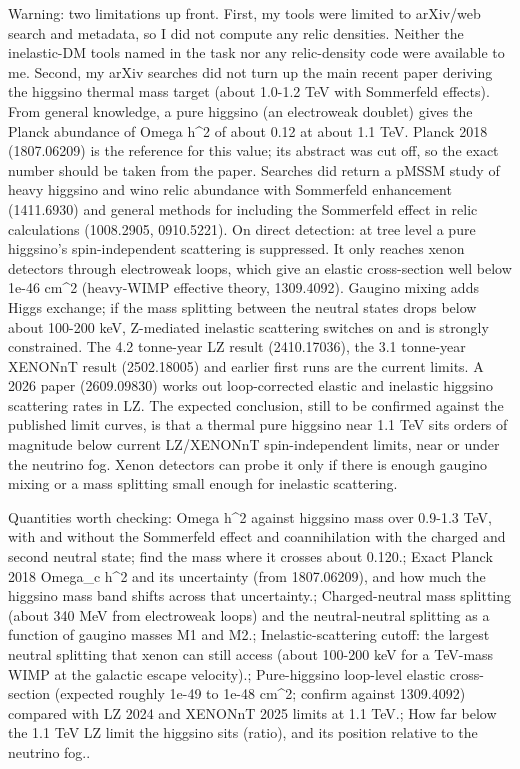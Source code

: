 \documentclass[11pt,a4paper]{article}
\begin{document}
Warning: two limitations up front. First, my tools were limited to arXiv/web search and metadata, so I did not compute any relic densities. Neither the inelastic-DM tools named in the task nor any relic-density code were available to me. Second, my arXiv searches did not turn up the main recent paper deriving the higgsino thermal mass target (about 1.0-1.2 TeV with Sommerfeld effects). From general knowledge, a pure higgsino (an electroweak doublet) gives the Planck abundance of Omega h\textasciicircum{}2 of about 0.12 at about 1.1 TeV. Planck 2018 (1807.06209) is the reference for this value; its abstract was cut off, so the exact number should be taken from the paper. Searches did return a pMSSM study of heavy higgsino and wino relic abundance with Sommerfeld enhancement (1411.6930) and general methods for including the Sommerfeld effect in relic calculations (1008.2905, 0910.5221). On direct detection: at tree level a pure higgsino's spin-independent scattering is suppressed. It only reaches xenon detectors through electroweak loops, which give an elastic cross-section well below 1e-46 cm\textasciicircum{}2 (heavy-WIMP effective theory, 1309.4092). Gaugino mixing adds Higgs exchange; if the mass splitting between the neutral states drops below about 100-200 keV, Z-mediated inelastic scattering switches on and is strongly constrained. The 4.2 tonne-year LZ result (2410.17036), the 3.1 tonne-year XENONnT result (2502.18005) and earlier first runs are the current limits. A 2026 paper (2609.09830) works out loop-corrected elastic and inelastic higgsino scattering rates in LZ. The expected conclusion, still to be confirmed against the published limit curves, is that a thermal pure higgsino near 1.1 TeV sits orders of magnitude below current LZ/XENONnT spin-independent limits, near or under the neutrino fog. Xenon detectors can probe it only if there is enough gaugino mixing or a mass splitting small enough for inelastic scattering.

Quantities worth checking: Omega h\textasciicircum{}2 against higgsino mass over 0.9-1.3 TeV, with and without the Sommerfeld effect and coannihilation with the charged and second neutral state; find the mass where it crosses about 0.120.; Exact Planck 2018 Omega\_c h\textasciicircum{}2 and its uncertainty (from 1807.06209), and how much the higgsino mass band shifts across that uncertainty.; Charged-neutral mass splitting (about 340 MeV from electroweak loops) and the neutral-neutral splitting as a function of gaugino masses M1 and M2.; Inelastic-scattering cutoff: the largest neutral splitting that xenon can still access (about 100-200 keV for a TeV-mass WIMP at the galactic escape velocity).; Pure-higgsino loop-level elastic cross-section (expected roughly 1e-49 to 1e-48 cm\textasciicircum{}2; confirm against 1309.4092) compared with LZ 2024 and XENONnT 2025 limits at 1.1 TeV.; How far below the 1.1 TeV LZ limit the higgsino sits (ratio), and its position relative to the neutrino fog..
\end{document}
